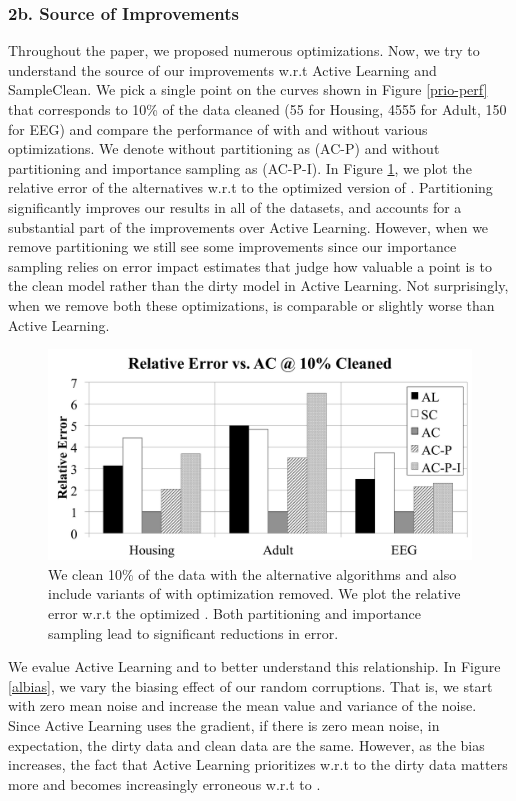 \subsubsection{2b. Source of Improvements}
Throughout the paper, we proposed numerous optimizations.
Now, we try to understand the source of our improvements w.r.t Active Learning and SampleClean.
We pick a single point on the curves shown in Figure \ref{prio-perf} that corresponds to 10\% of the data cleaned (55 for Housing, 4555 for Adult, 150 for EEG) and compare the performance of \sys with and without various optimizations.
We denote \sys without partitioning as (AC-P) and \sys without partitioning and importance sampling as (AC-P-I).
In Figure \ref{opts}, we plot the relative error of the alternatives w.r.t to the optimized version of \sys.
Partitioning significantly improves our results in all of the datasets, and accounts for a substantial part of the improvements over Active Learning.
However, when we remove partitioning we still see some improvements since our importance sampling relies on error impact estimates that judge how valuable a point is to the clean model rather than the dirty model in Active Learning.
Not surprisingly, when we remove both these optimizations, \sys is comparable or slightly worse than Active Learning.

\begin{figure}[ht!]
\centering
 \includegraphics[width=\columnwidth]{exp/exp8.pdf}
 \caption{We clean 10\% of the data with the alternative algorithms and also include variants of \sys with optimization removed. We plot the relative error w.r.t the optimized \sys. Both partitioning and importance sampling lead to significant reductions in error. \label{opts}}
\end{figure}

We evalue Active Learning and \sys to better understand this relationship.
In Figure \ref{albias}, we vary the biasing effect of our random corruptions.
That is, we start with zero mean noise and increase the mean value and variance of the noise.
Since Active Learning uses the gradient, if there is zero mean noise, in expectation, the dirty data and clean data are the same.
However, as the bias increases, the fact that Active Learning prioritizes w.r.t to the dirty data matters more and becomes increasingly erroneous w.r.t to \sys.


